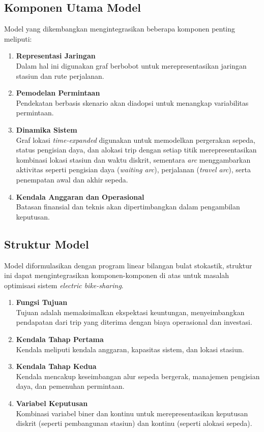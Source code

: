 \subsection{Komponen Utama Model}
Model yang dikembangkan mengintegrasikan beberapa komponen penting meliputi:
\begin{enumerate}
    \item \textbf{Representasi Jaringan}\\ Dalam hal ini digunakan graf berbobot untuk merepresentasikan jaringan stasiun dan rute perjalanan.
    \item \textbf{Pemodelan Permintaan}\\ Pendekatan berbasis skenario akan diadopsi untuk menangkap variabilitas permintaan.
    \item \textbf{Dinamika Sistem}\\ Graf lokasi \textit{time-expanded} digunakan untuk memodelkan pergerakan sepeda, status pengisian daya, dan alokasi trip dengan setiap titik merepresentasikan kombinasi lokasi stasiun dan waktu diskrit, sementara \textit{arc} menggambarkan aktivitas seperti pengisian daya (\textit{waiting arc}), perjalanan (\textit{travel arc}), serta penempatan awal dan akhir sepeda.
    \item \textbf{Kendala Anggaran dan Operasional}\\ Batasan finansial dan teknis akan dipertimbangkan dalam pengambilan keputusan.
\end{enumerate}

\subsection{Struktur Model}
Model diformulasikan dengan program linear bilangan bulat stokastik, struktur ini dapat mengintegrasikan komponen-komponen di atas untuk masalah optimisasi sistem \textit{electric bike-sharing}.
\begin{enumerate}
    \item \textbf{Fungsi Tujuan}\\ Tujuan adalah memaksimalkan ekspektasi keuntungan, menyeimbangkan pendapatan dari trip yang diterima dengan biaya operasional dan investasi.
    \item \textbf{Kendala Tahap Pertama}\\ Kendala meliputi kendala anggaran, kapasitas sistem, dan lokasi stasiun.
    \item \textbf{Kendala Tahap Kedua}\\ Kendala mencakup keseimbangan alur sepeda bergerak, manajemen pengisian daya, dan pemenuhan permintaan.
    \item \textbf{Variabel Keputusan}\\ Kombinasi variabel biner dan kontinu untuk merepresentasikan keputusan diskrit (seperti pembangunan stasiun) dan kontinu (seperti alokasi sepeda).
\end{enumerate}

